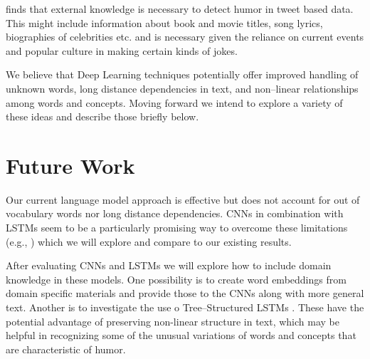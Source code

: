 \documentclass[11pt,a4paper]{article}
\begin{document}
\cite{PotashRR16} finds that 
external knowledge is necessary to detect humor in tweet
based data. This might include information about book and movie
titles, song lyrics, biographies of celebrities etc. and is
necessary given the reliance on current events and
popular culture in making certain kinds of jokes.

We believe that Deep Learning techniques potentially offer
improved handling of unknown words, long distance dependencies
in text, and non--linear relationships among words and
concepts. Moving forward we intend to explore a variety of
these ideas and describe those briefly below.

\section{Future Work}

Our current language model approach is effective but 
does not account for out of vocabulary
words nor long distance dependencies. CNNs in combination with
LSTMs seem to be a particularly promising way to overcome 
these limitations (e.g., \cite{BerteroF16}) which we will
explore and compare to our existing results.

After evaluating
CNNs and LSTMs we will explore how to include domain knowledge
in these models. One possibility is to
create word embeddings
from domain specific materials and provide those to the CNNs
along with more general text. Another is to investigate the use
o Tree--Structured LSTMs \cite{TaiSM15}. These have the potential
advantage of preserving non-linear structure in text, which may
be helpful in recognizing some of the unusual variations of words
and concepts that are characteristic of humor. 

 
%
%


\end{document}
